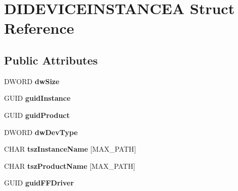 \hypertarget{struct_d_i_d_e_v_i_c_e_i_n_s_t_a_n_c_e_a}{\section{D\-I\-D\-E\-V\-I\-C\-E\-I\-N\-S\-T\-A\-N\-C\-E\-A Struct Reference}
\label{struct_d_i_d_e_v_i_c_e_i_n_s_t_a_n_c_e_a}
}
\subsection*{Public Attributes}
\begin{DoxyCompactItemize}
\item 
\hypertarget{struct_d_i_d_e_v_i_c_e_i_n_s_t_a_n_c_e_a_af8e77cbdc28ee930992e652d75521943}{D\-W\-O\-R\-D {\bfseries dw\-Size}}\label{struct_d_i_d_e_v_i_c_e_i_n_s_t_a_n_c_e_a_af8e77cbdc28ee930992e652d75521943}

\item 
\hypertarget{struct_d_i_d_e_v_i_c_e_i_n_s_t_a_n_c_e_a_a5090841ff6d5a076138e5feecc16e908}{G\-U\-I\-D {\bfseries guid\-Instance}}\label{struct_d_i_d_e_v_i_c_e_i_n_s_t_a_n_c_e_a_a5090841ff6d5a076138e5feecc16e908}

\item 
\hypertarget{struct_d_i_d_e_v_i_c_e_i_n_s_t_a_n_c_e_a_a2075eb10c9f2a576821322f316e0c307}{G\-U\-I\-D {\bfseries guid\-Product}}\label{struct_d_i_d_e_v_i_c_e_i_n_s_t_a_n_c_e_a_a2075eb10c9f2a576821322f316e0c307}

\item 
\hypertarget{struct_d_i_d_e_v_i_c_e_i_n_s_t_a_n_c_e_a_aefe3c9863c8d29ff60607e049d1f819d}{D\-W\-O\-R\-D {\bfseries dw\-Dev\-Type}}\label{struct_d_i_d_e_v_i_c_e_i_n_s_t_a_n_c_e_a_aefe3c9863c8d29ff60607e049d1f819d}

\item 
\hypertarget{struct_d_i_d_e_v_i_c_e_i_n_s_t_a_n_c_e_a_a50c4dc6ed1f03e26c42f6738361665e4}{C\-H\-A\-R {\bfseries tsz\-Instance\-Name} \mbox{[}M\-A\-X\-\_\-\-P\-A\-T\-H\mbox{]}}\label{struct_d_i_d_e_v_i_c_e_i_n_s_t_a_n_c_e_a_a50c4dc6ed1f03e26c42f6738361665e4}

\item 
\hypertarget{struct_d_i_d_e_v_i_c_e_i_n_s_t_a_n_c_e_a_aa77c89e6efa6040214cbfe196f050e72}{C\-H\-A\-R {\bfseries tsz\-Product\-Name} \mbox{[}M\-A\-X\-\_\-\-P\-A\-T\-H\mbox{]}}\label{struct_d_i_d_e_v_i_c_e_i_n_s_t_a_n_c_e_a_aa77c89e6efa6040214cbfe196f050e72}

\item 
\hypertarget{struct_d_i_d_e_v_i_c_e_i_n_s_t_a_n_c_e_a_a331d10d3bd5e19435cd7c89d6e9e59c0}{G\-U\-I\-D {\bfseries guid\-F\-F\-Driver}}\label{struct_d_i_d_e_v_i_c_e_i_n_s_t_a_n_c_e_a_a331d10d3bd5e19435cd7c89d6e9e59c0}


\end{DoxyCompactItemize}
